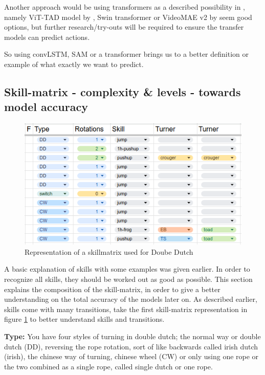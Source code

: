 Another approach would be using transformers as a described possibility in \textcite{Yin_2024}, namely ViT-TAD model by \textcite{Yang_2023}, Swin transformer \textcite{Liu_2021} or VideoMAE v2 by \textcite{Wang_2023} seem good options, but further research/try-outs will be required to ensure the transfer models can predict actions.

So using convLSTM, SAM or a transformer brings us to a better definition or example of what exactly we want to predict.


\subsection{Skill-matrix - complexity \& levels - towards model accuracy}
\label{subsec:skillcomplexiteit}

\begin{figure}
    \centering
    \includegraphics[width=0.95\linewidth]{img/doubledutch-matrix}
    \caption[skillmatrix-DD]{Representation of a skillmatrix used for Doube Dutch}
    \label{fig:doubledutch-skillmatrix}
\end{figure}

A basic explanation of skills with some examples was given earlier. In order to recognize all skills, they should be worked out as good as possible. This section explains the composition of the skill-matrix, in order to give a better understanding on the total accuracy of the models later on. As described earlier, skills come with many transitions, take the first skill-matrix representation in figure \ref{fig:doubledutch-skillmatrix} to better understand skills and transitions.

\textbf{Type:} You have four styles of turning in double dutch; the normal way or double dutch (DD), reversing the rope rotation, sort of like backwards called irish dutch (irish), the chinese way of turning, chinese wheel (CW) or only using one rope or the two combined as a single rope, called single dutch or one rope.

